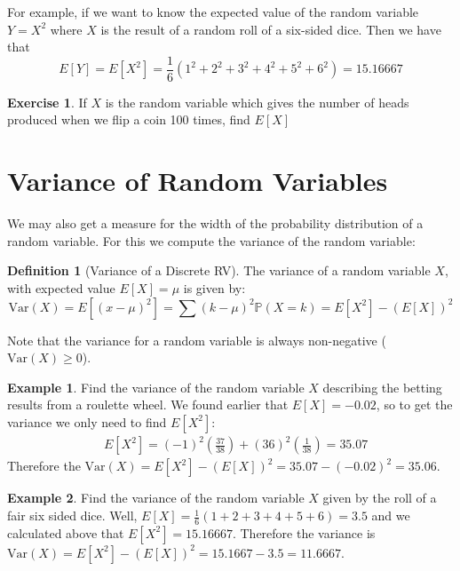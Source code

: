 \documentclass[
]{book}
\newcommand{\var}{\mathrm{Var}}
\newcommand{\prob}[1]{{\mathbb{P}(#1)}}
\theoremstyle{definition}
\newtheorem{definition}{Definition}[chapter]
\theoremstyle{definition}
\newtheorem{example}{Example}[chapter]
\theoremstyle{definition}
\newtheorem{exercise}{Exercise}[chapter]
\theoremstyle{definition}
\theoremstyle{remark}
\begin{document}
For example, if we want to know the expected value of the random variable \(Y=X^2\) where \(X\) is the result of a random roll of a six-sided dice. Then we have that \[E[Y]=E[X^2]=\frac{1}{6} (1^2+2^2+3^2+4^2+5^2+6^2)=15.16667\]

\begin{exercise}
\protect\hypertarget{exr:unnamed-chunk-268}{}\label{exr:unnamed-chunk-268}If \(X\) is the random variable which gives the number of heads produced when we flip a coin 100 times, find \(E[X]\)
\end{exercise}

\hypertarget{variance-of-random-variables}{%
\section{Variance of Random Variables}\label{variance-of-random-variables}}

We may also get a measure for the width of the probability distribution of a random variable. For this we compute the variance of the random variable:

\begin{definition}[Variance of a Discrete RV]
\protect\hypertarget{def:unnamed-chunk-269}{}\label{def:unnamed-chunk-269}The variance of a random variable \(X\), with expected value \(E[X]=\mu\) is given by: \[\var(X)= E[(x-\mu)^2]=\sum (k-\mu)^2 \prob{X=k}=E[X^2]-(E[X])^2 \]
\end{definition}

Note that the variance for a random variable is always non-negative (\(\var(X)\geq0\)).

\begin{example}
\protect\hypertarget{exm:unnamed-chunk-270}{}\label{exm:unnamed-chunk-270}Find the variance of the random variable \(X\) describing the betting results from a roulette wheel. We found earlier that \(E[X]=-0.02\), so to get the variance we only need to find \(E[X^2]\):
\[
\begin{aligned}
&E[X^2]=(-1)^2\left(\frac{37}{38}\right)+(36)^2\left( \frac{1}{38}\right)=35.07
\end{aligned}
\]
Therefore the \(\var(X)=E[X^2]-(E[X])^2=35.07-(-0.02)^2=35.06\).
\end{example}

\begin{example}
\protect\hypertarget{exm:unnamed-chunk-271}{}\label{exm:unnamed-chunk-271}Find the variance of the random variable \(X\) given by the roll of a fair six sided dice. Well, \(E[X]=\frac{1}{6}(1+2+3+4+5+6)=3.5\) and we calculated above that \(E[X^2]=15.16667\). Therefore the variance is \(\var(X)=E[X^2]-(E[X])^2=15.1667-3.5=11.6667\).
\end{example}
\end{document}
